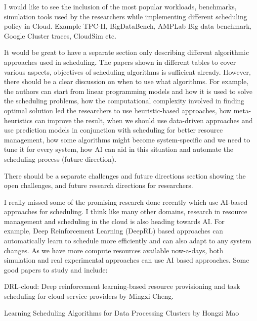 I would like to see the inclusion of the most popular workloads,
benchmarks, simulation tools used by the researchers while
implementing different scheduling policy in Cloud. Example TPC-H,
BigDataBench, AMPLab Big data benchmark, Google Cluster traces,
CloudSim etc.


It would be great to have a separate section only describing different
algorithmic approaches used in scheduling. The papers shown in
different tables to cover various aspects, objectives of scheduling
algorithms is sufficient already. However, there should be a clear
discussion on when to use what algorithms. For example, the authors
can start from linear programming models and how it is used to solve
the scheduling problems, how the computational complexity involved in
finding optimal solution led the researchers to use heuristic-based
approaches, how meta-heuristics can improve the result, when we should
use data-driven approaches and use prediction models in conjunction
with scheduling for better resource management, how some algorithms
might become system-specific and we need to tune it for every system,
how AI can aid in this situation and automate the scheduling process
(future direction).


There should be a separate challenges and future directions section
showing the open challenges, and future research directions for
researchers.


I really missed some of the promising research done recently which use
AI-based approaches for scheduling. I think like many other domains,
research in resource management and scheduling in the cloud is also
heading towards AI. For example, Deep Reinforcement Learning (DeepRL)
based approaches can automatically learn to schedule more efficiently
and can also adapt to any system changes. As we have more compute
resources available now-a-days, both simulation and real experimental
approaches can use AI based approaches. Some good papers to study and
include:


DRL-cloud: Deep reinforcement learning-based resource provisioning and
task scheduling for cloud service providers by Mingxi Cheng.


Learning Scheduling Algorithms for Data Processing Clusters by Hongzi Mao

